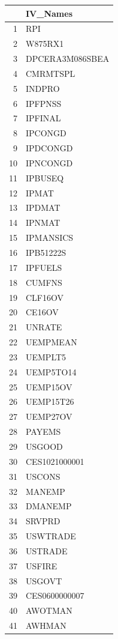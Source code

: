 \begin{longtable}{rl}
  \hline
 & IV\_Names \\ 
  \hline
1 & RPI \\ 
  2 & W875RX1 \\ 
  3 & DPCERA3M086SBEA \\ 
  4 & CMRMTSPL \\ 
  5 & INDPRO \\ 
  6 & IPFPNSS \\ 
  7 & IPFINAL \\ 
  8 & IPCONGD \\ 
  9 & IPDCONGD \\ 
  10 & IPNCONGD \\ 
  11 & IPBUSEQ \\ 
  12 & IPMAT \\ 
  13 & IPDMAT \\ 
  14 & IPNMAT \\ 
  15 & IPMANSICS \\ 
  16 & IPB51222S \\ 
  17 & IPFUELS \\ 
  18 & CUMFNS \\ 
  19 & CLF16OV \\ 
  20 & CE16OV \\ 
  21 & UNRATE \\ 
  22 & UEMPMEAN \\ 
  23 & UEMPLT5 \\ 
  24 & UEMP5TO14 \\ 
  25 & UEMP15OV \\ 
  26 & UEMP15T26 \\ 
  27 & UEMP27OV \\ 
  28 & PAYEMS \\ 
  29 & USGOOD \\ 
  30 & CES1021000001 \\ 
  31 & USCONS \\ 
  32 & MANEMP \\ 
  33 & DMANEMP \\ 
  34 & SRVPRD \\ 
  35 & USWTRADE \\ 
  36 & USTRADE \\ 
  37 & USFIRE \\ 
  38 & USGOVT \\ 
  39 & CES0600000007 \\ 
  40 & AWOTMAN \\ 
  41 & AWHMAN \\ 

\end{longtable}
